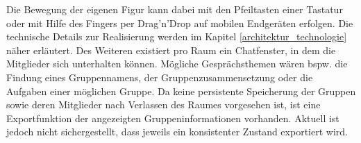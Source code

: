 Die Bewegung der eigenen Figur kann dabei mit den Pfeiltasten einer Tastatur oder mit Hilfe des Fingers per Drag'n'Drop auf mobilen Endgeräten erfolgen. Die technische Details zur Realisierung werden im Kapitel \ref{architektur_technologie} näher erläutert. 
\newline\newline
Des Weiteren existiert pro Raum ein Chatfenster, in dem die Mitglieder sich unterhalten können. Mögliche Gesprächsthemen wären bspw. die Findung eines Gruppennamens, der Gruppenzusammensetzung oder die Aufgaben einer möglichen Gruppe. Da keine persistente Speicherung der Gruppen sowie deren Mitglieder nach Verlassen des Raumes vorgesehen ist, ist eine Exportfunktion der angezeigten Gruppeninformationen vorhanden. Aktuell ist jedoch nicht sichergestellt, dass jeweils ein konsistenter Zustand exportiert wird.